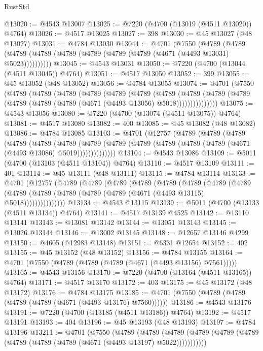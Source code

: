 \begin{lexlean}{RustStd}
\begin{coremodule}
@13020 := @4543 @13007
@13025 := @7220 (@4700 (@13019 (@4511 @13020)) @4764)
@13026 := @4517 @13025
@13027 := 398
@13030 := @45 @13027 (@48 @13027)
@13031 := @4784 @13030
@13044 := @4701
    (@7550
      (@4789 (@4789 (@4789 (@4789 (@4789 (@4789 (@4789 (@4789 (@4671 (@4493 @13031) @5023))))))))))
@13045 := @4543 @13031
@13050 := @7220 (@4700 (@13044 (@4511 @13045)) @4764)
@13051 := @4517 @13050
@13052 := 399
@13055 := @45 @13052 (@48 @13052)
@13056 := @4784 @13055
@13074 := @4701
    (@7550
      (@4789
        (@4789
          (@4789
            (@4789
              (@4789
                (@4789
                  (@4789
                    (@4789
                      (@4789 (@4789 (@4789 (@4789 (@4789 (@4671 (@4493 @13056) @5018)))))))))))))))
@13075 := @4543 @13056
@13080 := @7220 (@4700 (@13074 (@4511 @13075)) @4764)
@13081 := @4517 @13080
@13082 := 400
@13085 := @45 @13082 (@48 @13082)
@13086 := @4784 @13085
@13103 := @4701
    (@12757
      (@4789
        (@4789
          (@4789
            (@4789
              (@4789
                (@4789
                  (@4789
                    (@4789 (@4789 (@4789 (@4789 (@4789 (@4671 (@4493 @13086) @5019))))))))))))))
@13104 := @4543 @13086
@13109 := @5011 (@4700 (@13103 (@4511 @13104)) @4764)
@13110 := @4517 @13109
@13111 := 401
@13114 := @45 @13111 (@48 @13111)
@13115 := @4784 @13114
@13133 := @4701
    (@12757
      (@4789
        (@4789
          (@4789
            (@4789
              (@4789
                (@4789
                  (@4789
                    (@4789
                      (@4789 (@4789 (@4789 (@4789 (@4789 (@4671 (@4493 @13115) @5018)))))))))))))))
@13134 := @4543 @13115
@13139 := @5011 (@4700 (@13133 (@4511 @13134)) @4764)
@13141 := @4517 @13139 @4525
@13142 := @13110 @13141
@13143 := @13081 @13142
@13144 := @13051 @13143
@13145 := @13026 @13144
@13146 := @13002 @13145
@13148 := @12657 @13146 @4299
@13150 := @4605 (@12983 @13148)
@13151 := @6331 @12654
@13152 := 402
@13155 := @45 @13152 (@48 @13152)
@13156 := @4784 @13155
@13164 := @4701 (@7550 (@4789 (@4789 (@4789 (@4671 (@4493 @13156) @7561)))))
@13165 := @4543 @13156
@13170 := @7220 (@4700 (@13164 (@4511 @13165)) @4764)
@13171 := @4517 @13170
@13172 := 403
@13175 := @45 @13172 (@48 @13172)
@13176 := @4784 @13175
@13185 := @4701 (@7550 (@4789 (@4789 (@4789 (@4789 (@4671 (@4493 @13176) @7560))))))
@13186 := @4543 @13176
@13191 := @7220 (@4700 (@13185 (@4511 @13186)) @4764)
@13192 := @4517 @13191
@13193 := 404
@13196 := @45 @13193 (@48 @13193)
@13197 := @4784 @13196
@13211 := @4701
    (@7550
      (@4789
        (@4789
          (@4789 (@4789 (@4789 (@4789 (@4789 (@4789 (@4789 (@4671 (@4493 @13197) @5022)))))))))))

\end{coremodule}
\end{lexlean}
